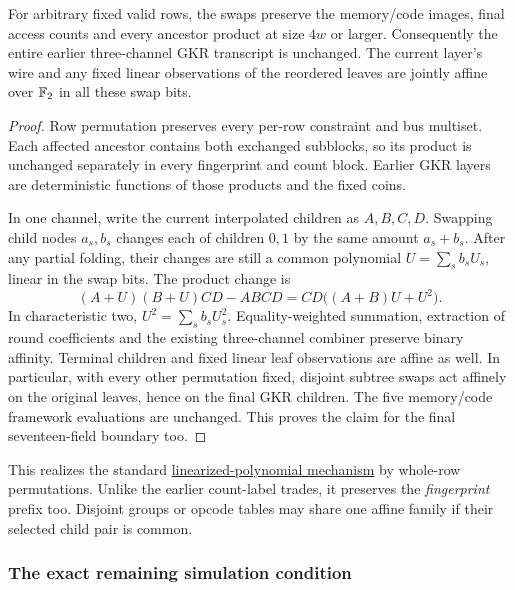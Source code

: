 \begin{lemma}
For arbitrary fixed valid rows, the swaps preserve the memory/code images, final access counts and every ancestor product at size $4w$ or larger. Consequently the entire earlier three-channel GKR transcript is unchanged. The current layer's wire and any fixed linear observations of the reordered leaves are jointly affine over $\mathbb{F}_2$ in all these swap bits.
\end{lemma}
\begin{proof}
Row permutation preserves every per-row constraint and bus multiset. Each affected ancestor contains both exchanged subblocks, so its product is unchanged separately in every fingerprint and count block. Earlier GKR layers are deterministic functions of those products and the fixed coins.

In one channel, write the current interpolated children as $A,B,C,D$. Swapping child nodes $a_s,b_s$ changes each of children $0,1$ by the same amount $a_s+b_s$. After any partial folding, their changes are still a common polynomial $U=\sum_s b_s U_s$, linear in the swap bits. The product change is
\[
 (A+U)(B+U)CD-ABCD=CD\bigl((A+B)U+U^2\bigr).
\]
In characteristic two, $U^2=\sum_s b_sU_s^2$. Equality-weighted summation, extraction of round coefficients and the existing three-channel combiner preserve binary affinity. Terminal children and fixed linear leaf observations are affine as well. In particular, with every other permutation fixed, disjoint subtree swaps act affinely on the original leaves, hence on the final GKR children. The five memory/code framework evaluations are unchanged. This proves the claim for the final seventeen-field boundary too.
\end{proof}

This realizes the standard \href{https://arxiv.org/abs/1211.5475}{linearized-polynomial mechanism} by whole-row permutations. Unlike the earlier count-label trades, it preserves the \emph{fingerprint} prefix too. Disjoint groups or opcode tables may share one affine family if their selected child pair is common.

\subsubsection{The exact remaining simulation condition}

